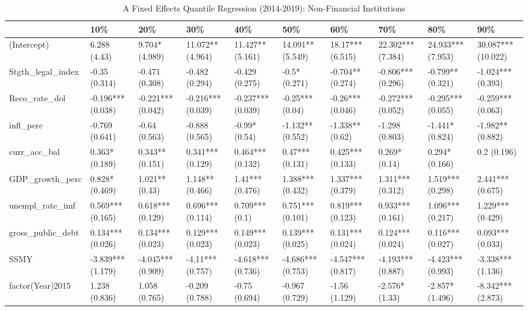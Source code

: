\begin{table}[ht]
\centering
\caption{A Fixed Effects Quantile Regression (2014-2019): Non-Financial Institutions} 
\begingroup\small
\begin{tabular}{llllllllll}
  \toprule
 & 10\% & 20\% & 30\% & 40\% & 50\% & 60\% & 70\% & 80\% & 90\% \\ 
  \midrule
(Intercept) & 6.288 (4.43) & 9.704* (4.989) & 11.072** (4.964) & 11.427** (5.161) & 14.091** (5.549) & 18.17*** (6.515) & 22.302*** (7.384) & 24.933*** (7.953) & 30.087*** (10.022) \\ 
  Stgth\_legal\_index & -0.35 (0.314) & -0.471 (0.308) & -0.482 (0.294) & -0.429 (0.275) & -0.5* (0.271) & -0.704** (0.274) & -0.806*** (0.296) & -0.799** (0.321) & -1.024*** (0.393) \\ 
  Reco\_rate\_dol & -0.196*** (0.038) & -0.221*** (0.042) & -0.216*** (0.039) & -0.237*** (0.039) & -0.25*** (0.04) & -0.26*** (0.046) & -0.272*** (0.052) & -0.295*** (0.055) & -0.259*** (0.063) \\ 
  infl\_perc & -0.769 (0.641) & -0.64 (0.563) & -0.888 (0.565) & -0.99* (0.54) & -1.132** (0.552) & -1.338** (0.62) & -1.298 (0.803) & -1.441* (0.824) & -1.982** (0.882) \\ 
  curr\_acc\_bal & 0.363* (0.189) & 0.343** (0.151) & 0.341*** (0.129) & 0.464*** (0.132) & 0.47*** (0.131) & 0.425*** (0.133) & 0.269* (0.14) & 0.294* (0.166) & 0.2 (0.196) \\ 
  GDP\_growth\_perc & 0.828* (0.469) & 1.021** (0.43) & 1.148** (0.466) & 1.41*** (0.476) & 1.388*** (0.432) & 1.337*** (0.379) & 1.311*** (0.312) & 1.519*** (0.298) & 2.441*** (0.675) \\ 
  unempl\_rate\_imf & 0.569*** (0.165) & 0.618*** (0.129) & 0.696*** (0.114) & 0.709*** (0.1) & 0.751*** (0.101) & 0.819*** (0.123) & 0.933*** (0.161) & 1.096*** (0.217) & 1.229*** (0.429) \\ 
  gross\_public\_debt & 0.134*** (0.026) & 0.134*** (0.023) & 0.129*** (0.023) & 0.149*** (0.023) & 0.139*** (0.025) & 0.131*** (0.024) & 0.124*** (0.024) & 0.116*** (0.027) & 0.093*** (0.033) \\ 
  SSMY & -3.839*** (1.179) & -4.045*** (0.909) & -4.11*** (0.757) & -4.618*** (0.736) & -4.686*** (0.753) & -4.547*** (0.817) & -4.193*** (0.887) & -4.423*** (0.993) & -3.338*** (1.136) \\ 
  factor(Year)2015 & 1.238 (0.836) & 1.058 (0.765) & -0.209 (0.788) & -0.75 (0.694) & -0.967 (0.729) & -1.56 (1.129) & -2.576* (1.33) & -2.857* (1.496) & -8.342*** (2.873) \\ 

\end{tabular}
\end{table}
